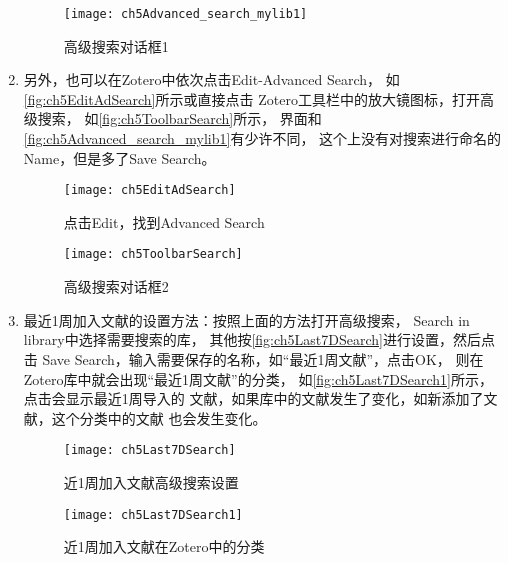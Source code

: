 \documentclass[cn,11pt,chinese]{elegantbook}
\begin{document}
\begin{enumerate}
						\begin{figure}[ht]
							\centering
							\texttt{[image: ch5Advanced\_search\_mylib1]}
							\caption{高级搜索对话框1}
							\label{fig:ch5Advanced_search_mylib1}
						\end{figure}
					\item 另外，也可以在Zotero中依次点击Edit-Advanced Search，
					如\autoref{fig:ch5EditAdSearch}所示或直接点击
					Zotero工具栏中的放大镜图标，打开高级搜索，
					如\autoref{fig:ch5ToolbarSearch}所示，
					界面和\autoref{fig:ch5Advanced_search_mylib1}有少许不同，
					这个上没有对搜索进行命名的Name，但是多了Save Search。
						\begin{figure}[ht]
							\centering
							\texttt{[image: ch5EditAdSearch]}
							\caption{点击Edit，找到Advanced Search}
							\label{fig:ch5EditAdSearch}
						\end{figure}
						\begin{figure}[ht]
							\centering
							\texttt{[image: ch5ToolbarSearch]}
							\caption{高级搜索对话框2}
							\label{fig:ch5ToolbarSearch}
						\end{figure}
					\item 最近1周加入文献的设置方法：按照上面的方法打开高级搜索，
					Search in library中选择需要搜索的库，
					其他按\autoref{fig:ch5Last7DSearch}进行设置，然后点击
					Save Search，输入需要保存的名称，如“最近1周文献”，点击OK，
					则在Zotero库中就会出现“最近1周文献”的分类，
					如\autoref{fig:ch5Last7DSearch1}所示，点击会显示最近1周导入的
					文献，如果库中的文献发生了变化，如新添加了文献，这个分类中的文献
					也会发生变化。
						\begin{figure}[ht]
							\centering
							\texttt{[image: ch5Last7DSearch]}
							\caption{近1周加入文献高级搜索设置}
							\label{fig:ch5Last7DSearch}
						\end{figure}	

						\begin{figure}[ht]
							\centering
							\texttt{[image: ch5Last7DSearch1]}
							\caption{近1周加入文献在Zotero中的分类}
							\label{fig:ch5Last7DSearch1}
						\end{figure}	
																

\end{enumerate}
\end{document}
